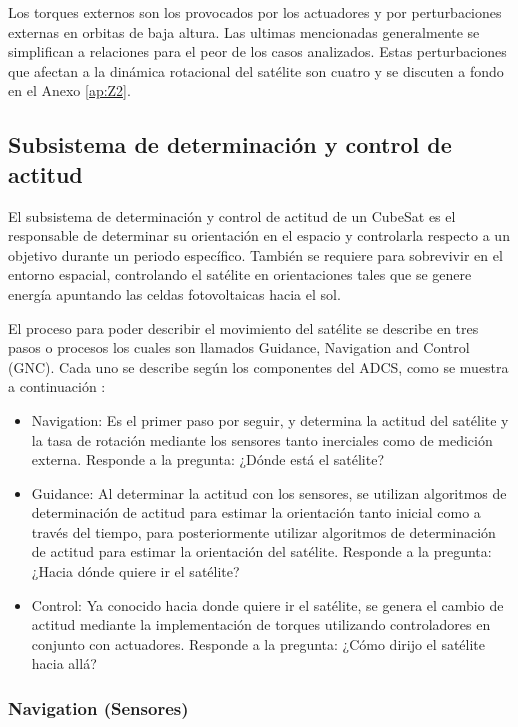 Los torques externos son los provocados por los actuadores y por perturbaciones externas en orbitas de baja altura. Las ultimas mencionadas generalmente se simplifican a relaciones para el peor de los casos analizados. Estas perturbaciones que afectan a la dinámica rotacional del satélite son cuatro y se discuten a fondo en el Anexo \ref{ap:Z2}.

\subsection{Subsistema de determinación y control de actitud}

El subsistema de determinación y control de actitud de un CubeSat es el responsable de determinar su orientación en el espacio y controlarla respecto a un objetivo durante un periodo específico. También se requiere para sobrevivir en el entorno espacial, controlando el satélite en orientaciones tales que se genere energía apuntando las celdas fotovoltaicas hacia el sol.

El proceso para poder describir el movimiento del satélite se describe en tres pasos o procesos los cuales son llamados Guidance, Navigation and Control (GNC). Cada uno se describe según los componentes del ADCS, como se muestra a continuación \cite{ref28}:

\begin{itemize}
	\item Navigation: Es el primer paso por seguir, y determina la actitud del satélite y la tasa de rotación mediante los sensores tanto inerciales como de medición externa. Responde a la pregunta: ¿Dónde está el satélite?
	\item Guidance: Al determinar la actitud con los sensores, se utilizan algoritmos de determinación de actitud para estimar la orientación tanto inicial como a través del tiempo, para posteriormente utilizar algoritmos de determinación de actitud para estimar la orientación del satélite. Responde a la pregunta: ¿Hacia dónde quiere ir el satélite?
	\item Control: Ya conocido hacia donde quiere ir el satélite, se genera el cambio de actitud mediante la implementación de torques utilizando controladores en conjunto con actuadores. Responde a la pregunta: ¿Cómo dirijo el satélite hacia allá?
\end{itemize}

\subsubsection{Navigation (Sensores)}

